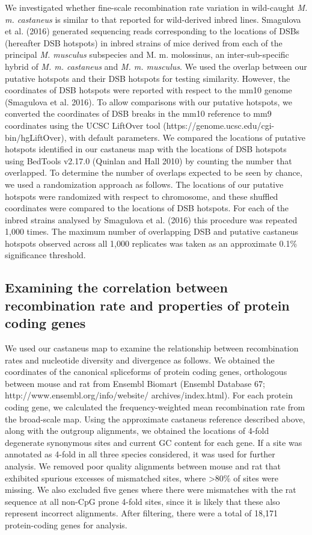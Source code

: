 	We investigated whether fine-scale recombination rate variation in wild-caught \textit{M. m. castaneus} is similar to that reported for wild-derived inbred lines. Smagulova et al. (2016) generated sequencing reads corresponding to the locations of DSBs (hereafter DSB hotspots) in inbred strains of mice derived from each of the principal \textit{M. musculus} subspecies and M. m. molossinus, an inter-sub-specific hybrid of \textit{M. m. castaneus} and \textit{M. m. musculus}. We used the overlap between our putative hotspots and their DSB hotspots for testing similarity. However, the coordinates of DSB hotspots were reported with respect to the mm10 genome (Smagulova et al. 2016). To allow comparisons with our putative hotspots, we converted the coordinates of DSB breaks in the mm10 reference to mm9 coordinates using the UCSC LiftOver tool (https://genome.ucsc.edu/cgi-bin/hgLiftOver), with default parameters. We compared the locations of putative hotspots identified in our castaneus map with the locations of DSB hotspots using BedTools v2.17.0 (Quinlan and Hall 2010) by counting the number that overlapped. To determine the number of overlaps expected to be seen by chance, we used a randomization approach as follows. The locations of our putative hotspots were randomized with respect to chromosome, and these shuffled coordinates were compared to the locations of DSB hotspots. For each of the inbred strains analysed by Smagulova et al. (2016) this procedure was repeated 1,000 times. The maximum number of overlapping DSB and putative castaneus hotspots observed across all 1,000 replicates was taken as an approximate 0.1\% significance threshold.
 
\subsection{Examining the correlation between recombination rate and properties of protein coding genes}

We used our castaneus map to examine the relationship between recombination rates and nucleotide diversity and divergence as follows. We obtained the coordinates of the canonical spliceforms of protein coding genes, orthologous between mouse and rat from Ensembl Biomart (Ensembl Database 67; http://www.ensembl.org/info/website/ archives/index.html). For each protein coding gene, we calculated the frequency-weighted mean recombination rate from the broad-scale map. Using the approximate castaneus reference described above, along with the outgroup alignments, we obtained the locations of 4-fold degenerate synonymous sites and current GC content for each gene. If a site was annotated as 4-fold in all three species considered, it was used for further analysis. We removed poor quality alignments between mouse and rat that exhibited spurious excesses of mismatched sites, where >80\% of sites were missing. We also excluded five genes where there were mismatches with the rat sequence at all non-CpG prone 4-fold sites, since it is likely that these also represent incorrect alignments. After filtering, there were a total of 18,171 protein-coding genes for analysis.

